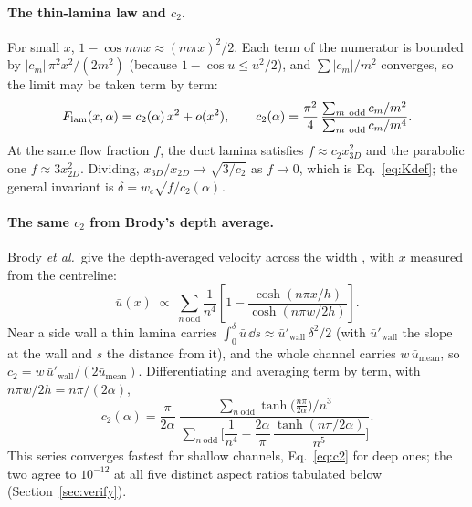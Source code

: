 \paragraph{The thin-lamina law and $c_2$.} For small $x$, $1-\cos m\pi x\approx(m\pi x)^2/2$.
Each term of the numerator is bounded by $|c_m|\,\pi^2x^2/(2m^2)$ (because $1-\cos u\le u^2/2$),
and $\sum|c_m|/m^2$ converges, so the limit may be taken term by term:
\begin{equation}
F_{\mathrm{lam}}(x,\alpha)=c_2(\alpha)\,x^2+o(x^2),\qquad
c_2(\alpha)=\frac{\pi^2}{4}\,\frac{\sum_{m\ \text{odd}} c_m/m^2}{\sum_{m\ \text{odd}} c_m/m^4}.
\label{eq:c2}
\end{equation}
At the same flow fraction $f$, the duct lamina satisfies $f\approx c_2x_{3D}^2$ and the parabolic
one $f\approx3x_{2D}^2$. Dividing, $x_{3D}/x_{2D}\to\sqrt{3/c_2}$ as $f\to0$, which is
Eq.~\eqref{eq:Kdef}; the general invariant is $\delta=w_c\sqrt{f/c_2(\alpha)}$.

\paragraph{The same $c_2$ from Brody's depth average.} Brody \emph{et al.}\ give the
depth-averaged velocity across the width \cite[p.~3433, eqn~15]{bbrody}, with $x$ measured
from the centreline:
\begin{equation}
\bar u(x)\;\propto\;\sum_{n\ \text{odd}}\frac{1}{n^{4}}\left[1-\frac{\cosh(n\pi x/h)}{\cosh(n\pi w/2h)}\right].
\end{equation}
Near a side wall a thin lamina carries
$\int_0^\delta\bar u\,\dd s\approx\bar u'_{\text{wall}}\,\delta^2/2$ (with $\bar u'_{\text{wall}}$ the
slope at the wall and $s$ the distance from it), and the whole channel carries $w\,\bar u_{\text{mean}}$,
so $c_2=w\,\bar u'_{\text{wall}}/(2\bar u_{\text{mean}})$. Differentiating and averaging term by term,
with $n\pi w/2h=n\pi/(2\alpha)$,
\begin{equation}
c_2(\alpha)=\frac{\pi}{2\alpha}\;
\frac{\sum_{n\ \text{odd}}\tanh\!\big(\tfrac{n\pi}{2\alpha}\big)/n^3}
{\sum_{n\ \text{odd}}\Big[\dfrac{1}{n^4}-\dfrac{2\alpha}{\pi}\,\dfrac{\tanh(n\pi/2\alpha)}{n^5}\Big]} .
\label{eq:c2brody}
\end{equation}
This series converges fastest for shallow channels, Eq.~\eqref{eq:c2} for deep ones; the two agree
to $10^{-12}$ at all five distinct aspect ratios tabulated below (Section~\ref{sec:verify}).

